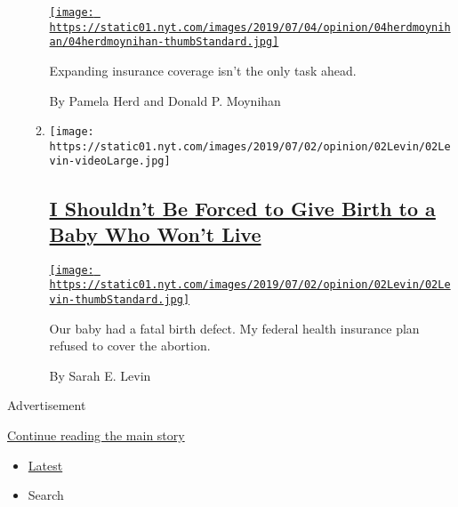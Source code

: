 \begin{enumerate}
\begin{enumerate}
    \href{/2019/07/04/opinion/medicare-for-all.html}{\texttt{[image: https://static01.nyt.com/images/2019/07/04/opinion/04herdmoynihan/04herdmoynihan-thumbStandard.jpg]}}

    Expanding insurance coverage isn't the only task ahead.

    By Pamela Herd and Donald P. Moynihan
  \item
    \texttt{[image: https://static01.nyt.com/images/2019/07/02/opinion/02Levin/02Levin-videoLarge.jpg]}

    \hypertarget{i-shouldnt-be-forced-to-give-birth-to-a-baby-who-wont-live}{%
    \subsection{\texorpdfstring{\href{/2019/07/03/opinion/abortion-hyde-amendment.html}{I
    Shouldn't Be Forced to Give Birth to a Baby Who Won't
    Live}}{I Shouldn't Be Forced to Give Birth to a Baby Who Won't Live}}\label{i-shouldnt-be-forced-to-give-birth-to-a-baby-who-wont-live}}

    \href{/2019/07/03/opinion/abortion-hyde-amendment.html}{\texttt{[image: https://static01.nyt.com/images/2019/07/02/opinion/02Levin/02Levin-thumbStandard.jpg]}}

    Our baby had a fatal birth defect. My federal health insurance plan
    refused to cover the abortion.

    By Sarah E. Levin
  \end{enumerate}
\end{enumerate}

Advertisement

\protect\hyperlink{after-mid1}{Continue reading the main story}

\begin{itemize}
\tightlist
\item
  \protect\hyperlink{stream-panel}{Latest}
\item
  Search
\end{itemize}

